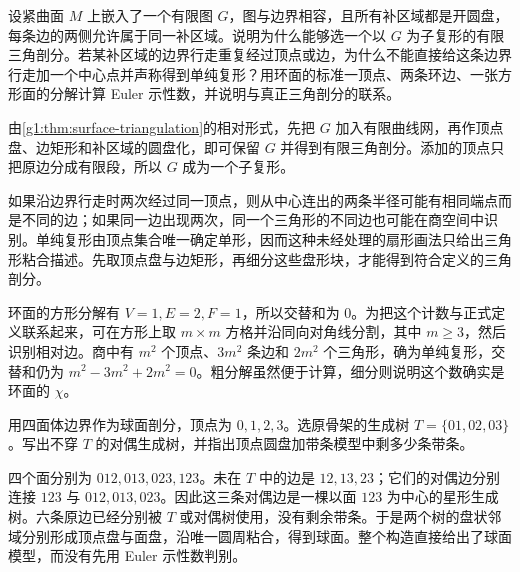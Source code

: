 \begin{exercise}\label{g1:ex:relative-triangulation-euler}
	设紧曲面 \(M\) 上嵌入了一个有限图 \(G\)，图与边界相容，且所有补区域都是开圆盘，每条边的两侧允许属于同一补区域。说明为什么能够选一个以 \(G\) 为子复形的有限三角剖分。若某补区域的边界行走重复经过顶点或边，为什么不能直接给这条边界行走加一个中心点并声称得到单纯复形？用环面的标准一顶点、两条环边、一张方形面的分解计算 Euler 示性数，并说明与真正三角剖分的联系。
\end{exercise}
\begin{solution}
	由\cref{g1:thm:surface-triangulation}的相对形式，先把 \(G\) 加入有限曲线网，再作顶点盘、边矩形和补区域的圆盘化，即可保留 \(G\) 并得到有限三角剖分。添加的顶点只把原边分成有限段，所以 \(G\) 成为一个子复形。

	如果沿边界行走时两次经过同一顶点，则从中心连出的两条半径可能有相同端点而是不同的边；如果同一边出现两次，同一个三角形的不同边也可能在商空间中识别。单纯复形由顶点集合唯一确定单形，因而这种未经处理的扇形画法只给出三角形粘合描述。先取顶点盘与边矩形，再细分这些盘形块，才能得到符合定义的三角剖分。

	环面的方形分解有 \(V=1,E=2,F=1\)，所以交替和为 \(0\)。为把这个计数与正式定义联系起来，可在方形上取 \(m\times m\) 方格并沿同向对角线分割，其中 \(m\ge3\)，然后识别相对边。商中有 \(m^2\) 个顶点、\(3m^2\) 条边和 \(2m^2\) 个三角形，确为单纯复形，交替和仍为 \(m^2-3m^2+2m^2=0\)。粗分解虽然便于计算，细分则说明这个数确实是环面的 \(\chi\)。
\end{solution}

\begin{exercise}\label{g1:ex:tetrahedron-two-trees}
	用四面体边界作为球面剖分，顶点为 \(0,1,2,3\)。选原骨架的生成树 \(T=\{01,02,03\}\)。写出不穿 \(T\) 的对偶生成树，并指出顶点圆盘加带条模型中剩多少条带条。
\end{exercise}
\begin{solution}
	四个面分别为 \(012,013,023,123\)。未在 \(T\) 中的边是 \(12,13,23\)；它们的对偶边分别连接 \(123\) 与 \(012,013,023\)。因此这三条对偶边是一棵以面 \(123\) 为中心的星形生成树。六条原边已经分别被 \(T\) 或对偶树使用，没有剩余带条。于是两个树的盘状邻域分别形成顶点盘与面盘，沿唯一圆周粘合，得到球面。整个构造直接给出了球面模型，而没有先用 Euler 示性数判别。
\end{solution}

